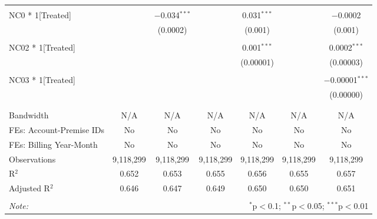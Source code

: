 \begin{table}[!htbp]
\begin{tabular}{@{\extracolsep{5pt}}lcccccc}
  & & & & & & \\ 
 NC0 * 1[Treated] &  & $-$0.034$^{***}$ &  & 0.031$^{***}$ &  & $-$0.0002 \\ 
  &  & (0.0002) &  & (0.001) &  & (0.001) \\ 
  & & & & & & \\ 
 NC02 * 1[Treated] &  &  &  & 0.001$^{***}$ &  & 0.0002$^{***}$ \\ 
  &  &  &  & (0.00001) &  & (0.00003) \\ 
  & & & & & & \\ 
 NC03 * 1[Treated] &  &  &  &  &  & $-$0.00001$^{***}$ \\ 
  &  &  &  &  &  & (0.00000) \\ 
  & & & & & & \\ 
\hline \\[-1.8ex] 
Bandwidth & N/A & N/A & N/A & N/A & N/A & N/A \\ 
FEs: Account-Premise IDs & No & No & No & No & No & No \\ 
FEs: Billing Year-Month & No & No & No & No & No & No \\ 
Observations & 9,118,299 & 9,118,299 & 9,118,299 & 9,118,299 & 9,118,299 & 9,118,299 \\ 
R$^{2}$ & 0.652 & 0.653 & 0.655 & 0.656 & 0.655 & 0.657 \\ 
Adjusted R$^{2}$ & 0.646 & 0.647 & 0.649 & 0.650 & 0.650 & 0.651 \\ 
\hline 
\hline \\[-1.8ex] 
\textit{Note:}  & \multicolumn{6}{r}{$^{*}$p$<$0.1; $^{**}$p$<$0.05; $^{***}$p$<$0.01} \\ 
\end{tabular} 
\end{table} 

